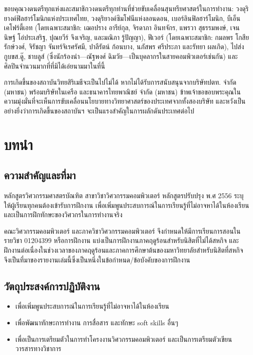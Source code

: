 \documentclass[16pt,a4]{internshipreport}
\begin{document}
ขอบคุณวงดนตรีทุกแห่งและสมาชิกวงดนตรีทุกท่านที่ช่วยขับเคลื่อนสุนทรียศาสตร์ในการทำงาน: วงดุริยางค์ฟิลฮาร์โมนิกแห่งประเทศไทย, วงดุริยางค์ซิมโฟนีแห่งลอนดอน, เบอร์ลินฟิลฮาร์โมนิก, บีเอ็นเคโฟร์ตี้เอท (โดยเฉพาะสมาชิก: เฌอปราง อารีย์กุล, จิรดาภา อินทจักร, แพรวา สุธรรมพงษ์, เจนนิษฐ์ โอ่ประเสริฐ, ปุณยวีร์ จึงเจริญ, และมณิภา รู้ปัญญา), ฟีเวอร์ (โดยเฉพาะสมาชิก: กมลพร โกสียรักษ์วงศ์, จิรัชญา จันทร์จิเรศรัศมี, ปาลีรัตน์ ก้อนบาง, นภัสพร ศรีประภา และรัทยา ผลเกิด), ไปส่งกูบขส.ดู๊, ชาบลูส์ (ซึ่งนักร้องนำ---ณัฐพงศ์ ฉิมวัย---เป็นบุคลากรในสายคอมพิวเตอร์เช่นกัน) และศิลปินจำนวนมากที่ที่มิได้เอ่ยนามมาในที่นี้

การเกิดขึ้นของสถาบันวิทยสิริเมธีจะเป็นไปไม่ได้ หากไม่ได้รับการสนับสนุนจากบริษัทปตท. จำกัด (มหาชน) พร้อมบริษัทในเครือ และธนาคารไทยพาณิชย์ จำกัด (มหาชน)  ข้าพเจ้าขอขอบพระคุณในความมุ่งมั่นที่จะเห็นการขับเคลื่อนนโยบายทางวิทยาศาสตร์ของประเทศจากทั้งสองบริษัท และหวังเป็นอย่างยิ่งว่าการเกิดขี้นของสถาบันฯ จะเป็นแรงสำคัญในการผลักดันประเทศต่อไป

\tableofcontents

\listoffigures

\listoftables

\chapter{บทนำ}

\section{ความสำคัญและที่มา}
หลักสูตรวิศวกรรมศาสตรบัณฑิต สาขาวิชาวิศวกรรมคอมพิวเตอร์ หลักสูตรปรับปรุง พ.ศ 2556 ระบุให้ผู้เรียนทุกคนต้องเข้ารับการฝึกงาน เพื่อเพิ่มพูนประสบการณ์ในการเรียนรู้ที่ไม่อาจหาได้ในห้องเรียน และเป็นการฝึกทักษะของวิศวกรในการทำงานจริง

คณะวิศวกรรมคอมพิวเตอร์ และภาควิชาวิศวกรรมคอมพิวเตอร์ จึงกำหนดให้มีการเรียนการสอนในรายวิชา 01204399 หรือการฝึกงาน แบ่งเป็นการฝึกงานภาคฤดูร้อนสำหรับนิสิตที่ไม่ได้สหกิจ และฝึกงานต่อเนื่องในช่วงเวลาของภาคฤดูร้อนและภาคการศึกษาต้นของมหาวิทยาลัยสำหรับนิสิตที่สหกิจ จึงเป็นที่มาของรายงานเล่มนี้ซึ่งเป็นหนึ่งในข้อกำหนด/ข้อบังคับของการฝึกงาน

\section{วัตถุประสงค์การปฏิบัติงาน}
\begin{itemize}
    \item เพื่อเพิ่มพูนประสบการณ์ในการเรียนรู้ที่ไม่อาจหาได้ในห้องเรียน
    \item เพื่อพัฒนาทักษะการทำงาน การสื่อสาร และทักษะ soft skills อื่นๆ
    \item เพื่อเป็นการเตรียมตัวในการทำโครงงานวิศวกรรมคอมพิวเตอร์ และเป็นการเตรียมตัวเขียนวารสารทางวิชาการ
\end{itemize}
\end{document}
